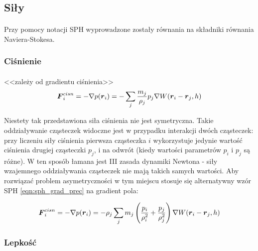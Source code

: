 \subsection{Siły}
\label{subsec:forces_ss}

\paragraph{}
Przy pomocy notacji SPH wyprowadzone zostały równania na składniki równania Naviera-Stokesa.
\par

\subsubsection{Ciśnienie}

\paragraph{}
<<zależy od gradientu ciśnienia>>
\begin{equation}
\boldsymbol{F}_i^{cisn} = -\nabla p(\boldsymbol{r}_i) = - \sum\limits_{j} {m_j \over \rho_j} p_j \nabla W(\boldsymbol{r}_i-\boldsymbol{r}_j, h)
\label{eqn:sph_force_pressure_1}
\end{equation}

Niestety tak przedstawiona siła ciśnienia nie jest symetryczna. Takie oddziaływanie cząsteczek widoczne jest w przypadku interakcji dwóch cząsteczek: przy liczeniu siły ciśnienia pierwsza cząsteczka $i$ wykorzystuje jedynie wartość ciśnienia drugiej cząsteczki $p_j$, i na odwrót (kiedy wartości parametrów $p_i$ i $p_j$ są różne). W ten sposób łamana jest III zasada dynamiki Newtona - siły wzajemnego oddziaływania cząsteczek nie mają takich samych wartości. Aby rozwiązać problem asymetryczności w tym miejscu stosuje się alternatywny wzór SPH \eqref{eqn:sph_grad_prec} na gradient pola:

\begin{equation}
\boldsymbol{F}_i^{cisn} = -\nabla p(\boldsymbol{r}_i) = - \rho_j \sum\limits_{j} m_j \left( {p_i \over \rho_i^2} + {p_j \over \rho_j^2} \right) \nabla W(\boldsymbol{r}_i-\boldsymbol{r}_j, h)
\label{eqn:sph_force_pressure}
\end{equation}

\par

\subsubsection{Lepkość}

